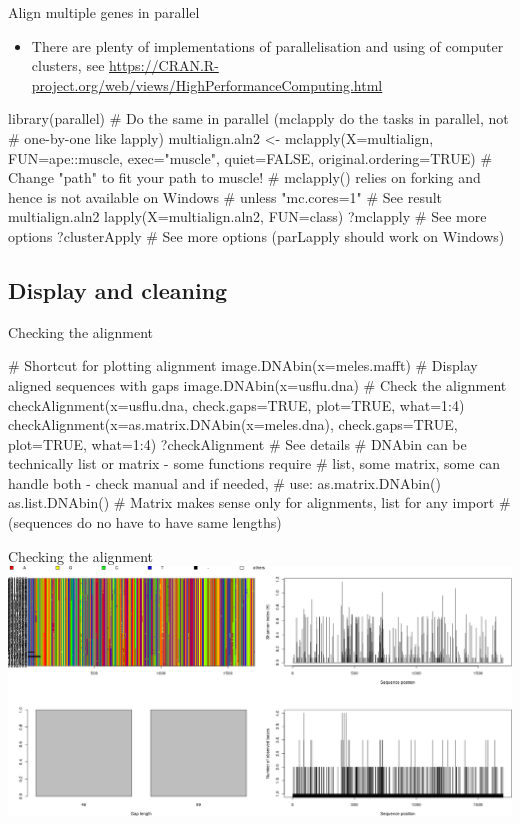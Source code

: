 \documentclass[compress, ucs, xelatex, 11pt, xcolor=svgnames,
	hyperref={
		bookmarks=true,
		unicode=true,
		colorlinks=true,
		pdftitle={Molecular data in R},
		plainpages=false,
		pdfauthor={Vojtech Zeisek},
		pdfsubject={Course about phylogeny and evolution in R},
		pdfcreator={XeLaTeX},
		pdfkeywords={R, evolution, phylogeny, molecular data},
		linkcolor=Tomato,
		anchorcolor=SaddleBrown,
		citecolor=Goldenrod,
		filecolor=DarkMagenta,
		menucolor=Sienna,
		urlcolor=DarkTurquoise,
		pdftex},
	url={hyphens, lowtilde} %
	]{beamer}
\begin{document}
\begin{frame}[fragile]{Align multiple genes in parallel}
	\begin{itemize}
		\item There are plenty of implementations of parallelisation and using of computer clusters, see \url{https://CRAN.R-project.org/web/views/HighPerformanceComputing.html}
	\end{itemize}
	\begin{spluscode}
    library(parallel)
    # Do the same in parallel (mclapply do the tasks in parallel, not
    # one-by-one like lapply)
    multialign.aln2 <- mclapply(X=multialign, FUN=ape::muscle,
      exec="muscle", quiet=FALSE, original.ordering=TRUE)
    # Change "path" to fit your path to muscle!
    # mclapply() relies on forking and hence is not available on Windows
    # unless "mc.cores=1"
    # See result
    multialign.aln2
    lapply(X=multialign.aln2, FUN=class)
    ?mclapply # See more options
    ?clusterApply # See more options (parLapply should work on Windows)
	\end{spluscode}
\end{frame}

\subsection{Display and cleaning}

\begin{frame}[fragile]{Checking the alignment}
	\begin{spluscode}
    # Shortcut for plotting alignment
    image.DNAbin(x=meles.mafft)
    # Display aligned sequences with gaps
    image.DNAbin(x=usflu.dna)
    # Check the alignment
    checkAlignment(x=usflu.dna, check.gaps=TRUE, plot=TRUE, what=1:4)
    checkAlignment(x=as.matrix.DNAbin(x=meles.dna), check.gaps=TRUE,
      plot=TRUE, what=1:4)
    ?checkAlignment # See details
    # DNAbin can be technically list or matrix - some functions require
    # list, some matrix, some can handle both - check manual and if needed,
    # use:
    as.matrix.DNAbin()
    as.list.DNAbin()
    # Matrix makes sense only for alignments, list for any import
    # (sequences do no have to have same lengths)
	\end{spluscode}
\end{frame}

\begin{frame}{Checking the alignment}
	\includegraphics[width=\textwidth]{checkalignment.png}
\end{frame}
\end{document}

